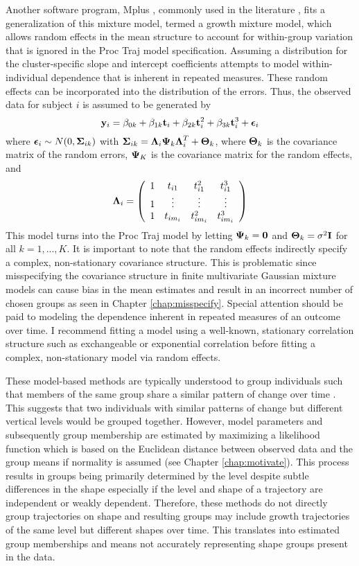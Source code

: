 Another software program, Mplus \cite{muthen2010}, commonly used in the literature \cite{li2007,garden2012}, fits a generalization of this mixture model, termed a growth mixture model, which allows random effects in the mean structure to account for within-group variation that is ignored in the Proc Traj model specification. Assuming a distribution for the cluster-specific slope and intercept coefficients attempts to model within-individual dependence that is inherent in repeated measures. These random effects can be incorporated into the distribution of the errors. Thus, the observed data for subject $i$ is assumed to be generated by
$$\mathbf y_{i} = \beta_{0k}+\beta_{1k} \mathbf t_{i} + \beta_{2k}\mathbf t_{i}^{2}+ \beta_{3k} \mathbf t_{i}^{3} +\boldsymbol \epsilon_{i}$$
where $\boldsymbol\epsilon_{i}\sim N(0,\boldsymbol\Sigma_{ik})$ with $\boldsymbol\Sigma_{ik}=\boldsymbol\Lambda_{i}\boldsymbol\Psi_{k}\boldsymbol\Lambda_{i}^{T}+\boldsymbol\Theta_{k}$, where $\boldsymbol\Theta_{k}$ is the covariance matrix of the random errors, $\boldsymbol\Psi_{K}$ is the covariance matrix for the random effects, and $$\boldsymbol\Lambda_{i}=\left(\begin{array}{cccc}1&t_{i1}&t_{i1}^{2}&t_{i1}^{3}\\ 1&\vdots&\vdots&\vdots\\ 1&t_{im_{i}}&t_{im_{i}}^{2}&t_{im_{i}}^{3} \end{array} \right)$$
This model turns into the Proc Traj model by letting $\boldsymbol\Psi_{k}=\mathbf 0$ and $\boldsymbol\Theta_{k}=\sigma^{2}\mathbf I$ for all $k=1,...,K$. It is important to note that the random effects indirectly specify a complex, non-stationary covariance structure. This is problematic since misspecifying the covariance structure in finite multivariate Gaussian mixture models can cause bias in the mean estimates and result in an incorrect number of chosen groups as seen in Chapter \ref{chap:misspecify}. Special attention should be paid to modeling the dependence inherent in repeated measures of an outcome over time. I recommend fitting a model using a well-known, stationary correlation structure such as exchangeable or exponential correlation before fitting a complex, non-stationary model via random effects. 

These model-based methods are typically understood to group individuals such that members of the same group share a similar pattern of change over time \cite{garden2012}. This suggests that two individuals with similar patterns of change but different vertical levels would be grouped together. However, model parameters and subsequently group membership are estimated by maximizing a likelihood function which is based on the Euclidean distance between observed data and the group means if normality is assumed (see Chapter \ref{chap:motivate}). This process results in groups being primarily determined by the level despite subtle differences in the shape especially if the level and shape of a trajectory are independent or weakly dependent. Therefore, these methods do not directly group trajectories on shape and resulting groups may include growth trajectories of the same level but different shapes over time. This translates into estimated group memberships and means not accurately representing shape groups present in the data.

